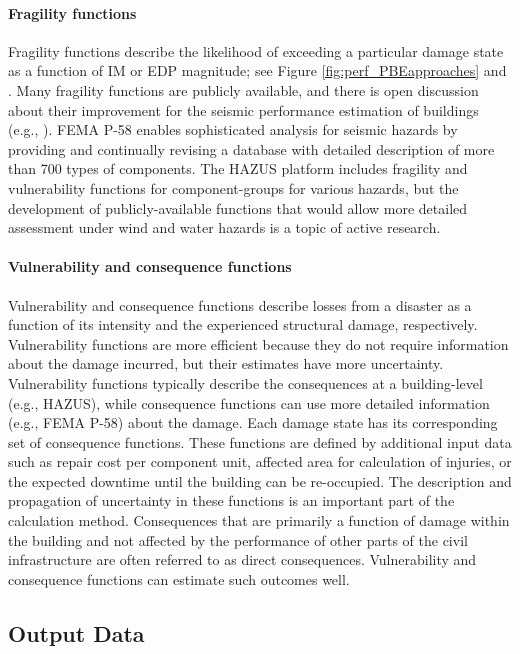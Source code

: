 \paragraph{Fragility functions} Fragility functions describe the likelihood of exceeding a particular damage state as a function of IM or EDP magnitude; see Figure \ref{fig:perf_PBEapproaches} and \citep{baker2021seismic}. Many fragility functions are publicly available, and there is open discussion about their improvement for the seismic performance estimation of buildings (e.g., \cite{silva2019current}). FEMA P-58 enables sophisticated analysis for seismic hazards by providing \citep{atc2012p-58} and continually revising \citep{atc2018p-58-1} a database with detailed description of more than 700 types of components. The HAZUS platform includes fragility and vulnerability functions for component-groups for various hazards, but the development of publicly-available functions that would allow more detailed assessment under wind and water hazards is a topic of active research.

\paragraph{Vulnerability and consequence functions} Vulnerability and consequence functions describe losses from a disaster as a function of its intensity and the experienced structural damage, respectively. Vulnerability functions are more efficient because they do not require information about the damage incurred, but their estimates have more uncertainty. Vulnerability functions typically describe the consequences at a building-level (e.g., HAZUS), while consequence functions can use more detailed information (e.g., FEMA P-58) about the damage. Each damage state has its corresponding set of consequence functions. These functions are defined by additional input data such as repair cost per component unit, affected area for calculation of injuries, or the expected downtime until the building can be re-occupied. The description and propagation of uncertainty in these functions is an important part of the calculation method. Consequences that are primarily a function of damage within the building and not affected by the performance of other parts of the civil infrastructure are often referred to as direct consequences. Vulnerability and consequence functions can estimate such outcomes well.

\subsection{Output Data}

